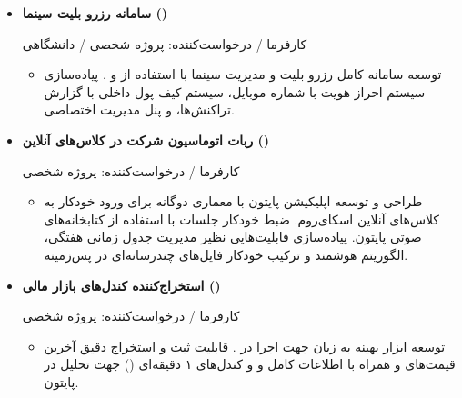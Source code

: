 \documentclass[10pt,a4paper]{article}
\newenvironment{projdesc}{%
  \begin{itemize}[label={}, leftmargin=2em, itemindent=0pt, nosep,
                  itemsep=0pt, topsep=3pt]%
}{\end{itemize}}
\newenvironment{cvblock}{%
  \begin{itemize}[label={}, leftmargin=2em, itemindent=0pt, nosep, itemsep=6pt, topsep=0pt]%
}{\end{itemize}}
\begin{document}
\begin{cvblock}
\item \textbf{\color{primary}سامانه رزرو بلیت سینما ()}\hfill{\small\color{muted}}\par
{\small\color{muted}کارفرما / درخواست‌کننده: پروژه شخصی / دانشگاهی}\par
\begin{projdesc}
  \item {\small توسعه سامانه کامل رزرو بلیت و مدیریت سینما با استفاده از  و . پیاده‌سازی سیستم احراز هویت با شماره موبایل، سیستم کیف پول داخلی با گزارش تراکنش‌ها، و پنل مدیریت اختصاصی.}
\end{projdesc}
\vspace{2pt}
\hfill{}
\end{cvblock}

\begin{cvblock}
\item \textbf{\color{primary}ربات اتوماسیون شرکت در کلاس‌های آنلاین ()}\par
{\small\color{muted}کارفرما / درخواست‌کننده: پروژه شخصی}\par
\begin{projdesc}
  \item {\small طراحی و توسعه اپلیکیشن پایتون با معماری دوگانه  برای ورود خودکار به کلاس‌های آنلاین اسکای‌روم. ضبط خودکار جلسات با استفاده از کتابخانه‌های صوتی پایتون. پیاده‌سازی قابلیت‌هایی نظیر مدیریت جدول زمانی هفتگی، الگوریتم هوشمند و ترکیب خودکار فایل‌های چندرسانه‌ای در پس‌زمینه.}
\end{projdesc}
\vspace{2pt}
\hfill{}
\end{cvblock}

\begin{cvblock}
\item \textbf{\color{primary}استخراج‌کننده کندل‌های بازار مالی ()}\par
{\small\color{muted}کارفرما / درخواست‌کننده: پروژه شخصی}\par
\begin{projdesc}
  \item {\small توسعه ابزار بهینه  به زبان  جهت اجرا در . قابلیت ثبت و استخراج دقیق آخرین قیمت‌های  و  همراه با اطلاعات کامل  و  و کندل‌های ۱ دقیقه‌ای () جهت تحلیل در پایتون.}
\end{projdesc}
\vspace{2pt}
\hfill{}
\end{cvblock}
\end{document}
